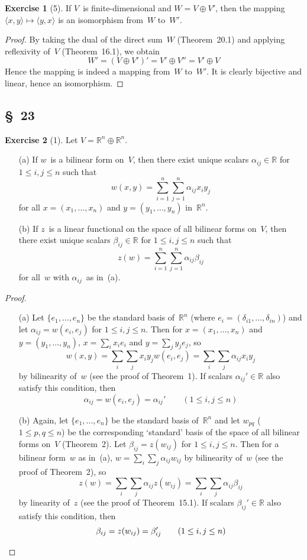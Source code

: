 \documentclass[letterpaper,12pt]{article}
\newcommand{\R}{\mathbb{R}}
\newcommand{\dsum}{\oplus}
\newcommand{\pair}[2]{\langle{#1},{#2}\rangle}
\theoremstyle{definition}
\newtheorem*{exer}{Exercise}
\theoremstyle{remark}
\theoremstyle{direction}
\begin{document}
\begin{exer}[5]
If \(V\)~is finite-dimensional and \(W=V\dsum V'\), then the mapping \(\pair{x}{y}\mapsto\pair{y}{x}\) is an isomorphism from~\(W\) to~\(W'\).
\end{exer}
\begin{proof}
By taking the dual of the direct sum~\(W\) (Theorem~20.1) and applying reflexivity of~\(V\) (Theorem~16.1), we obtain
\[W'=(V\dsum V')'=V'\dsum V''=V'\dsum V\]
Hence the mapping is indeed a mapping from~\(W\) to~\(W'\). It is clearly bijective and linear, hence an isomorphism.
\end{proof}

\subsection*{\S~23}
\begin{exer}[1]
Let \(V=\R^n\dsum\R^n\).
\begin{enumerate}
\item[(a)] If \(w\)~is a bilinear form on~\(V\), then there exist unique scalars \(\alpha_{ij}\in\R\) for \(1\le i,j\le n\) such that
\[w(x,y)=\sum_{i=1}^n\sum_{j=1}^n\alpha_{ij}x_iy_j\]
for all \(x=(x_1,\ldots,x_n)\) and \(y=(y_1,\ldots,y_n)\) in~\(\R^n\).
\item[(b)] If \(z\)~is a linear functional on the space of all bilinear forms on~\(V\), then there exist unique scalars \(\beta_{ij}\in\R\) for \(1\le i,j\le n\) such that
\[z(w)=\sum_{i=1}^n\sum_{j=1}^n\alpha_{ij}\beta_{ij}\]
for all~\(w\) with \(\alpha_{ij}\)~as in~(a).
\end{enumerate}
\end{exer}
\begin{proof}\
\begin{enumerate}
\item[(a)] Let \(\{e_1,\ldots,e_n\}\) be the standard basis of~\(\R^n\) (where \(e_i=(\delta_{i1},\ldots,\delta_{in})\)) and let \(\alpha_{ij}=w(e_i,e_j)\) for \(1\le i,j\le n\). Then for \(x=(x_1,\ldots,x_n)\) and \(y=(y_1,\ldots,y_n)\), \(x=\sum_i x_ie_i\) and \(y=\sum_j y_je_j\), so
\[w(x,y)=\sum_i\sum_jx_iy_jw(e_i,e_j)=\sum_i\sum_j\alpha_{ij}x_iy_j\]
by bilinearity of~\(w\) (see the proof of Theorem~1). If scalars \(\alpha_{ij}'\in\R\) also satisfy this condition, then
\[\alpha_{ij}=w(e_i,e_j)=\alpha_{ij}'\qquad(1\le i,j\le n)\]
\item[(b)]
Again, let \(\{e_1,\ldots,e_n\}\) be the standard basis of~\(\R^n\) and let \(w_{pq}\) (\(1\le p,q\le n\)) be the corresponding `standard' basis of the space of all bilinear forms on~\(V\) (Theorem~2). Let \(\beta_{ij}=z(w_{ij})\) for \(1\le i,j\le n\). Then for a bilinear form~\(w\) as in~(a), \(w=\sum_i\sum_j\alpha_{ij}w_{ij}\) by bilinearity of~\(w\) (see the proof of Theorem~2), so
\[z(w)=\sum_i\sum_j\alpha_{ij}z(w_{ij})=\sum_i\sum_j\alpha_{ij}\beta_{ij}\]
by linearity of~\(z\) (see the proof of Theorem~15.1). If scalars \(\beta_{ij}'\in\R\) also satisfy this condition, then
\[\beta_{ij}=z(w_{ij})=\beta_{ij}'\qquad(1\le i,j\le n)\qedhere\]
\end{enumerate}
\end{proof}
\end{document}
